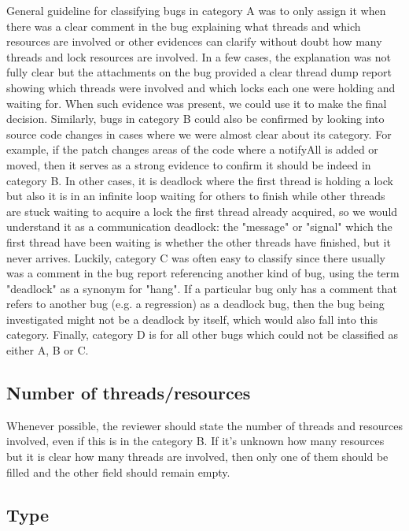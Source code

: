 General guideline for classifying bugs in category A was to only assign it when there was a clear comment in the bug explaining what threads and which resources are involved or other evidences can clarify without doubt how many threads and lock resources are involved. In a few cases, the explanation was not fully clear but the attachments on the bug provided a clear thread dump report showing which threads were involved and which locks each one were holding and waiting for. When such evidence was present, we could use it to make the final decision. Similarly, bugs in category B could also be confirmed by looking into source code changes in cases where we were almost clear about its category. For example, if the patch changes areas of the code where a notifyAll is added or moved, then it serves as a strong evidence to confirm it should be indeed in category B. In other cases, it is deadlock where the first thread is holding a lock but also it is in an infinite loop waiting for others to finish while other threads are stuck waiting to acquire a lock the first thread already acquired, so we would understand it as a communication deadlock: the "message" or "signal" which the first thread have been waiting is whether the other threads have finished, but it never arrives. Luckily, category C was often easy to classify since there usually was a comment in the bug report referencing another kind of bug, using the term "deadlock" as a synonym for "hang". If a particular bug only has a comment that refers to another bug (e.g. a regression) as a deadlock bug, then the bug being investigated might not be a deadlock by itself, which would also fall into this category. Finally, category D is for all other bugs which could not be classified as either A, B or C.


\subsection{Number of threads/resources}

Whenever possible, the reviewer should state the number of threads and resources involved, even if this is in the category B. If it's unknown how many resources but it is clear how many threads are involved, then only one of them should be filled and the other field should remain empty.

\subsection{Type}

